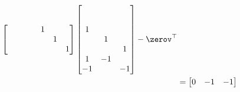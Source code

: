 \documentclass{ctexart}
\begin{document}
\begin{example} 
\begin{align*}
\begin{bmatrix}
                                               &   &   &   & 1 &    &    \\
                                               &   &   &   &   & 1  &    \\
                                               &   &   &   &   &    & 1  \\
                                         \end{bmatrix} \begin{bmatrix}
                                                              &    &    \\
                                                              &    &    \\
                                                           1  &    &    \\
                                                              & 1  &    \\
                                                              &    & 1  \\
                                                           1  & -1 &    \\
                                                           -1 &    & -1 \\
                                                       \end{bmatrix} - \zerov^\top \\
                       & = \begin{bmatrix}
                               0 & -1 & -1
                           \end{bmatrix}
    \end{align*}


\end{example}
\end{document}
